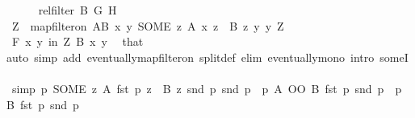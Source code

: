 \begin{isabellebody}
\ \ \ \ \isamarkupfalse%
\ {\isachardoublequoteopen}rel{\isacharunderscore}{\kern0pt}filter\ B\ {\isacharquery}{\kern0pt}G\ {\isacharquery}{\kern0pt}H{\isachardoublequoteclose}\isanewline
\ \ \ \ \isamarkupfalse%
\isanewline
\ \ \ \ \ \ \isamarkupfalse%
\ {\isacharquery}{\kern0pt}Z\ {\isacharequal}{\kern0pt}\ {\isachardoublequoteopen}map{\isacharunderscore}{\kern0pt}filter{\isacharunderscore}{\kern0pt}on\ {\isacharquery}{\kern0pt}AB\ {\isacharparenleft}{\kern0pt}{\isasymlambda}{\isacharparenleft}{\kern0pt}x{\isacharcomma}{\kern0pt}\ y{\isacharparenright}{\kern0pt}{\isachardot}{\kern0pt}\ {\isacharparenleft}{\kern0pt}SOME\ z{\isachardot}{\kern0pt}\ A\ x\ z\ {\isasymand}\ B\ z\ y{\isacharcomma}{\kern0pt}\ y{\isacharparenright}{\kern0pt}{\isacharparenright}{\kern0pt}\ Z{\isachardoublequoteclose}\isanewline
\ \ \ \ \ \ \isamarkupfalse%
\ {\isachardoublequoteopen}{\isasymforall}\isactrlsub F\ {\isacharparenleft}{\kern0pt}x{\isacharcomma}{\kern0pt}\ y{\isacharparenright}{\kern0pt}\ in\ {\isacharquery}{\kern0pt}Z{\isachardot}{\kern0pt}\ B\ x\ y{\isachardoublequoteclose}\ \isamarkupfalse%
\ that\isanewline
\ \ \ \ \ \ \ \ \isamarkupfalse%
{\isacharparenleft}{\kern0pt}auto\ simp\ add{\isacharcolon}{\kern0pt}\ eventually{\isacharunderscore}{\kern0pt}map{\isacharunderscore}{\kern0pt}filter{\isacharunderscore}{\kern0pt}on\ split{\isacharunderscore}{\kern0pt}def\ elim{\isacharbang}{\kern0pt}{\isacharcolon}{\kern0pt}\ eventually{\isacharunderscore}{\kern0pt}mono\ intro{\isacharcolon}{\kern0pt}\ someI{}{\isacharparenright}{\kern0pt}\isanewline
\ \ \ \ \ \ \isamarkupfalse%
\ {\isacharbrackleft}{\kern0pt}simp{\isacharbrackright}{\kern0pt}{\isacharcolon}{\kern0pt}\ {\isachardoublequoteopen}{\isacharparenleft}{\kern0pt}{\isasymlambda}p{\isachardot}{\kern0pt}\ {\isacharparenleft}{\kern0pt}SOME\ z{\isachardot}{\kern0pt}\ A\ {\isacharparenleft}{\kern0pt}fst\ p{\isacharparenright}{\kern0pt}\ z\ {\isasymand}\ B\ z\ {\isacharparenleft}{\kern0pt}snd\ p{\isacharparenright}{\kern0pt}{\isacharcomma}{\kern0pt}\ snd\ p{\isacharparenright}{\kern0pt}{\isacharparenright}{\kern0pt}\ {\isacharbackquote}{\kern0pt}\ {\isacharbraceleft}{\kern0pt}p{\isachardot}{\kern0pt}\ {\isacharparenleft}{\kern0pt}A\ OO\ B{\isacharparenright}{\kern0pt}\ {\isacharparenleft}{\kern0pt}fst\ p{\isacharparenright}{\kern0pt}\ {\isacharparenleft}{\kern0pt}snd\ p{\isacharparenright}{\kern0pt}{\isacharbraceright}{\kern0pt}\ {\isasymsubseteq}\ {\isacharbraceleft}{\kern0pt}p{\isachardot}{\kern0pt}\ B\ {\isacharparenleft}{\kern0pt}fst\ p{\isacharparenright}{\kern0pt}\ {\isacharparenleft}{\kern0pt}snd\ p{\isacharparenright}{\kern0pt}{\isacharbraceright}{\kern0pt}{\isachardoublequoteclose}\ \isamarkupfalse%

\end{isabellebody}
